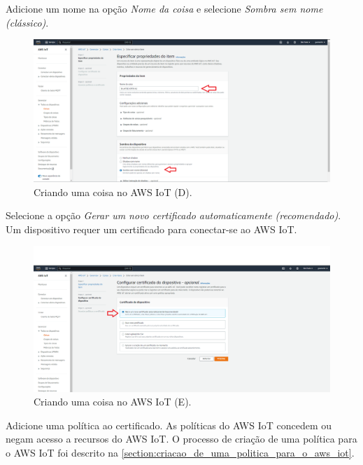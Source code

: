 Adicione um nome na opção \textit{Nome da coisa} e selecione \textit{Sombra sem nome (clássico)}.

\begin{figure}[H]
    \centering
    \caption{Criando uma coisa no AWS IoT (D).}
    \includegraphics[scale=0.315]{Imagens/criando_uma_coisa_no_aws_iot_3.png}
\end{figure}

Selecione a opção \textit{Gerar um novo certificado automaticamente (recomendado)}. Um dispositivo requer um certificado para conectar-se ao AWS IoT.

\begin{figure}[H]
    \centering
    \caption{Criando uma coisa no AWS IoT (E).}
    \includegraphics[scale=0.315]{Imagens/criando_uma_coisa_no_aws_iot_4.png}
\end{figure}

Adicione uma política ao certificado. As políticas do AWS IoT concedem ou negam acesso a recursos do AWS IoT. O processo de criação de uma política para o AWS IoT foi descrito na \autoref{section:criacao_de_uma_politica_para_o_aws_iot}.

